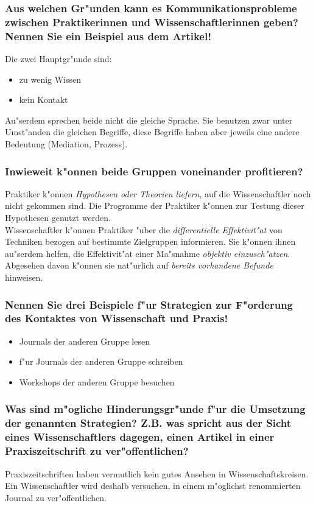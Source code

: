 \subsubsection{Aus welchen Gr"unden kann es Kommunikationsprobleme zwischen Praktikerinnen und Wissenschaftlerinnen geben? Nennen Sie ein Beispiel aus dem Artikel!}
Die zwei Hauptgr"unde sind:
\begin{itemize}
        \item zu wenig Wissen
        \item kein Kontakt
\end{itemize}

Au"serdem sprechen beide nicht die gleiche Sprache. Sie benutzen zwar unter Umst"anden die gleichen Begriffe, diese Begriffe haben aber jeweils eine andere Bedeutung (Mediation, Prozess).

\subsubsection{Inwieweit k"onnen beide Gruppen voneinander profitieren?}
Praktiker k"onnen \emph{Hypothesen oder Theorien liefern}, auf die Wissenschaftler noch nicht gekommen sind. Die Programme der Praktiker k"onnen zur Testung dieser Hypothesen genutzt werden.\\
Wissenschaftler k"onnen Praktiker "uber die \emph{differentielle Effektivit"at} von Techniken bezogen auf bestimmte Zielgruppen informieren. Sie k"onnen ihnen au"serdem helfen, die Effektivit"at einer Ma"snahme \emph{objektiv einzusch"atzen}. Abgesehen davon k"onnen sie nat"urlich auf \emph{bereits vorhandene Befunde} hinweisen.

\subsubsection{Nennen Sie drei Beispiele f"ur Strategien zur F"orderung des Kontaktes von Wissenschaft und Praxis!}
\begin{itemize}
        \item Journals der anderen Gruppe lesen
        \item f"ur Journals der anderen Gruppe schreiben
        \item Workshops der anderen Gruppe besuchen
\end{itemize}

\subsubsection{Was sind m"ogliche Hinderungsgr"unde f"ur die Umsetzung der genannten Strategien? Z.B. was spricht aus der Sicht eines Wissenschaftlers dagegen, einen Artikel in einer Praxiszeitschrift zu ver"offentlichen?}
Praxiszeitschriften haben vermutlich kein gutes Ansehen in Wissenschaftskreisen. Ein Wissenschaftler wird deshalb versuchen, in einem m"oglichst renommierten Journal zu ver"offentlichen.

